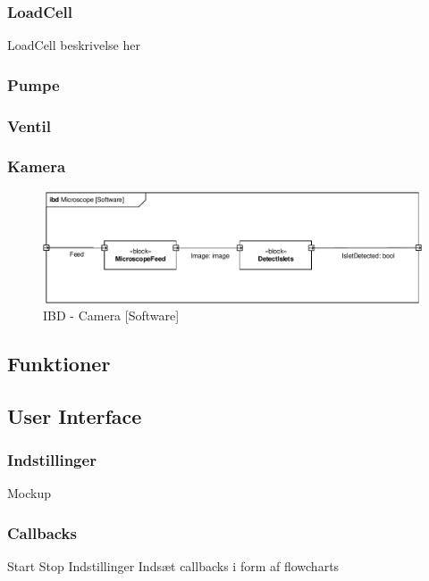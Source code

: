 \subsubsection{LoadCell}
LoadCell beskrivelse her
\subsubsection{Pumpe}
\subsubsection{Ventil}


\subsubsection{Kamera}
\begin{figure}[H]
	\centering
	\includegraphics[width=1\textwidth]{billeder/IBD_Software_Kamera-crop.pdf}
	\caption{IBD - Camera [Software]}
	\label{fig:ibd_software_camera}
\end{figure}


\subsection{Funktioner}
\subsection{User Interface}
\subsubsection{Indstillinger}
Mockup
\subsubsection{Callbacks}
Start
Stop
Indstillinger
Indsæt callbacks i form af flowcharts
